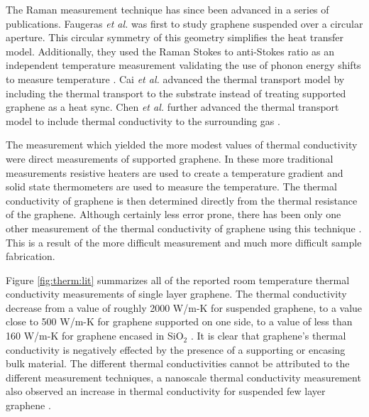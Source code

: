 The Raman measurement technique has since been advanced in a series of publications.
Faugeras \textit{et al.} was first to study graphene suspended over a circular aperture.
This circular symmetry of this geometry simplifies the heat transfer model.
Additionally, they used the Raman Stokes to anti-Stokes ratio as an independent temperature measurement validating the use of phonon energy shifts to measure temperature \cite{Faugeras2010}.
Cai \textit{et al.} advanced the thermal transport model by including the thermal transport to the substrate instead of treating supported graphene as a heat sync.
Chen \textit{et al.} further advanced the thermal transport model to include thermal conductivity to the surrounding gas \cite{Chen2011a}.

The measurement which yielded the more modest values of thermal conductivity were direct measurements of supported graphene.
In these more traditional measurements resistive heaters are used to create a temperature gradient and solid state thermometers are used to measure the temperature.
The thermal conductivity of graphene is then determined directly from the thermal resistance of the graphene.
Although certainly less error prone, there has been only one other measurement of the thermal conductivity of graphene using this technique \cite{Jang2010}.
This is a result of the more difficult measurement and much more difficult sample fabrication.

Figure \ref{fig:therm:lit} summarizes all of the reported room temperature thermal conductivity measurements of single layer graphene.
The thermal conductivity decrease from a value of roughly 2000 W/m-K for suspended graphene, to a value close to 500 W/m-K for graphene supported on one side, to a value of less than 160 W/m-K for graphene encased in SiO$_2$ \cite{Jang2010}.
It is clear that graphene's thermal conductivity is negatively effected by the presence of a supporting or encasing bulk material.
The different thermal conductivities cannot be attributed to the different measurement techniques, a nanoscale thermal conductivity measurement also observed an increase in thermal conductivity for suspended few layer graphene \cite{Pumarol2012}.

